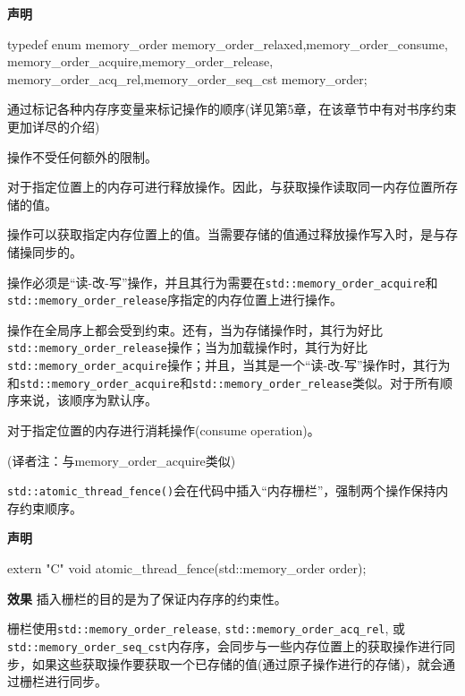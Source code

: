 \textbf{声明}

\begin{cpp}
typedef enum memory_order
{
  memory_order_relaxed,memory_order_consume,
  memory_order_acquire,memory_order_release,
  memory_order_acq_rel,memory_order_seq_cst
} memory_order;
\end{cpp}

通过标记各种内存序变量来标记操作的顺序(详见第5章，在该章节中有对书序约束更加详尽的介绍)


操作不受任何额外的限制。


对于指定位置上的内存可进行释放操作。因此，与获取操作读取同一内存位置所存储的值。


操作可以获取指定内存位置上的值。当需要存储的值通过释放操作写入时，是与存储操同步的。


操作必须是“读-改-写”操作，并且其行为需要在\texttt{std::memory\_order\_acquire}和\texttt{std::memory\_order\_release}序指定的内存位置上进行操作。


操作在全局序上都会受到约束。还有，当为存储操作时，其行为好比\texttt{std::memory\_order\_release}操作；当为加载操作时，其行为好比\texttt{std::memory\_order\_acquire}操作；并且，当其是一个“读-改-写”操作时，其行为和\texttt{std::memory\_order\_acquire}和\texttt{std::memory\_order\_release}类似。对于所有顺序来说，该顺序为默认序。


对于指定位置的内存进行消耗操作(consume operation)。

(译者注：与memory\_order\_acquire类似)


\texttt{std::atomic\_thread\_fence()}会在代码中插入“内存栅栏”，强制两个操作保持内存约束顺序。

\textbf{声明}

\begin{cpp}
extern "C" void atomic_thread_fence(std::memory_order order);
\end{cpp}

\textbf{效果}
插入栅栏的目的是为了保证内存序的约束性。

栅栏使用\texttt{std::memory\_order\_release}, \texttt{std::memory\_order\_acq\_rel}, 或 \texttt{std::memory\_order\_seq\_cst}内存序，会同步与一些内存位置上的获取操作进行同步，如果这些获取操作要获取一个已存储的值(通过原子操作进行的存储)，就会通过栅栏进行同步。

